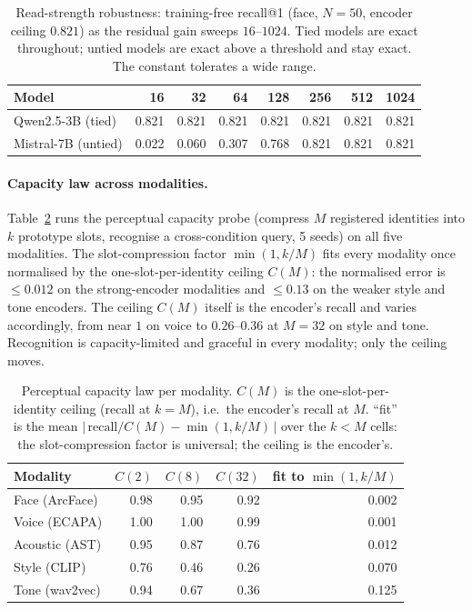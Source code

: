 \begin{table}[h]
\small\centering
\caption{Read-strength robustness: training-free recall@1 (face, $N{=}50$, encoder ceiling $0.821$) as the residual gain sweeps $16$--$1024$. Tied models are exact throughout; untied models are exact above a threshold and stay exact. The constant tolerates a wide range.}
\label{tab:gainrobust}
\begin{tabular}{@{}lrrrrrrr@{}}
\toprule
\textbf{Model} & \textbf{16} & \textbf{32} & \textbf{64} & \textbf{128} & \textbf{256} & \textbf{512} & \textbf{1024} \\
\midrule
Qwen2.5-3B (tied)   & 0.821 & 0.821 & 0.821 & 0.821 & 0.821 & 0.821 & 0.821 \\
Mistral-7B (untied) & 0.022 & 0.060 & 0.307 & 0.768 & 0.821 & 0.821 & 0.821 \\
\bottomrule
\end{tabular}
\end{table}

\paragraph{Capacity law across modalities.} Table~\ref{tab:capacitygrid} runs the perceptual capacity probe (compress $M$ registered identities into $k$ prototype slots, recognise a cross-condition query, 5 seeds) on all five modalities. The slot-compression factor $\min(1,k/M)$ fits every modality once normalised by the one-slot-per-identity ceiling $C(M)$: the normalised error is $\le 0.012$ on the strong-encoder modalities and $\le 0.13$ on the weaker style and tone encoders. The ceiling $C(M)$ itself is the encoder's recall and varies accordingly, from near $1$ on voice to $0.26$--$0.36$ at $M{=}32$ on style and tone. Recognition is capacity-limited and graceful in every modality; only the ceiling moves.

\begin{table}[h]
\small\centering
\caption{Perceptual capacity law per modality. $C(M)$ is the one-slot-per-identity ceiling (recall at $k{=}M$), i.e.\ the encoder's recall at $M$. ``fit'' is the mean $|\,\text{recall}/C(M) - \min(1,k/M)\,|$ over the $k{<}M$ cells: the slot-compression factor is universal; the ceiling is the encoder's.}
\label{tab:capacitygrid}
\begin{tabular}{@{}lrrrr@{}}
\toprule
\textbf{Modality} & $C(2)$ & $C(8)$ & $C(32)$ & \textbf{fit to $\min(1,k/M)$} \\
\midrule
Face (ArcFace)    & 0.98 & 0.95 & 0.92 & 0.002 \\
Voice (ECAPA)     & 1.00 & 1.00 & 0.99 & 0.001 \\
Acoustic (AST)    & 0.95 & 0.87 & 0.76 & 0.012 \\
Style (CLIP)      & 0.76 & 0.46 & 0.26 & 0.070 \\
Tone (wav2vec)    & 0.94 & 0.67 & 0.36 & 0.125 \\
\bottomrule
\end{tabular}
\end{table}


